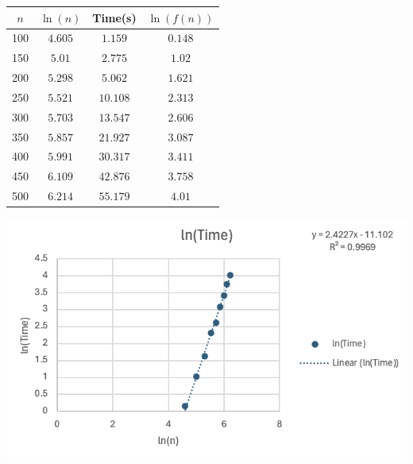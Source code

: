\documentclass{article}
\begin{document}
    \begin{minipage}{0.4\textwidth} %
    \centering

    
    
    \begin{tabular}{c|c|c|c}
        $n$ & $\ln(n)$ & Time(s) & $\ln(f(n))$ \\ \hline
        100 & $4.605$ & $1.159$ & $0.148$ \\\hline
        150 & $5.01$ & $2.775$ & $1.02$  \\\hline
        200 & $5.298$ & $5.062$ & $1.621$\\\hline
        250 & $5.521$ & $10.108$ & $2.313$\\\hline
        300 & $5.703$ & $13.547$ & $2.606$\\ \hline
        350 & $5.857$ & $21.927$ & $3.087$\\ \hline
        400 & $5.991$ & $30.317$ & $3.411$\\ \hline
        450 & $6.109$ & $42.876$ & $3.758$\\ \hline
        500 & $6.214$ & $55.179$ & $4.01$\\
    \end{tabular}

    
\end{minipage}%
\begin{minipage}{0.6\textwidth} %

    

    \centering
    \includegraphics[width=1\linewidth]{Graphs/Matrix.png} %

     
    
\end{minipage}\\
\end{document}
